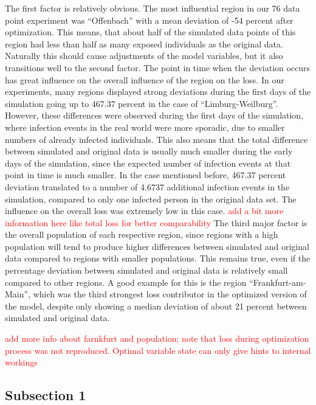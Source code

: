 The first factor is relatively obvious. The most influential region in our 76 data point experiment was ``Offenbach'' with
a mean deviation of -54 percent after optimization. This means, that about half of the simulated data points of this region
had less than half as many exposed individuals as the original data. Naturally this should cause adjustments of the model variables,
but it also transitions well to the second factor. The point in time when the deviation occurs has great influence on the 
overall influence of the region on the loss. In our experiments, many regions displayed strong deviations during the first
days of the simulation going up to 467.37 percent in the case of ``Limburg-Weilburg''. However, these differences were observed
during the first days of the simulation, where infection events in the real world were more sporadic, due to smaller numbers of
already infected individuals. This also means that the total difference between simulated and original data is usually much
smaller during the early days of the simulation, since the expected number of infection events at that point in time is much smaller.
In the case mentioned before, 467.37 percent deviation translated to a number of 4.6737 additional infection events in the simulation,
compared to only one infected person in the original data set. The influence on the overall loss was extremely low in this case.
\textcolor{red}{add a bit more information here like total loss for better comparability} %
The third major factor is the overall population of each respective region, since regions with a high population will tend to
produce higher differences between simulated and original data compared to regions with smaller populations. This remains true, even
if the percentage deviation between simulated and original data is relatively small compared to other regions. A good example for this
is the region ``Frankfurt-am-Main'', which was the third strongest loss contributor in the optimized version of the model, despite
only showing a median deviation of about 21 percent between simulated and original data.

\textcolor{red}{add more info about farnkfurt and population; note that loss during optimization process was not reproduced.
Optimal variable state can only give hints to internal workings}

\subsection{Subsection 1}


